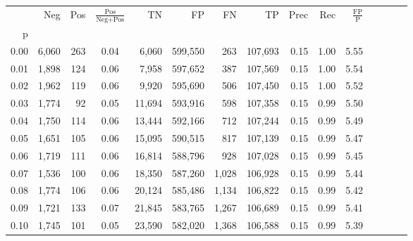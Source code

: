 \begin{tabular}{rrrcrrrrrrrrrrr}
\toprule
{} &     Neg &    Pos & $\frac{\text{Pos}}{\text{Neg}+\text{Pos}}$ &       TN &       FP &       FN &       TP &  Prec &   Rec & $\frac{\text{FP}}{\text{P}}$ \\
p    &         &        &                                            &          &          &          &          &       &       &                              \\
\midrule
0.00 &   6,060 &    263 &                                       0.04 &    6,060 &  599,550 &      263 &  107,693 &  0.15 &  1.00 &                         5.55 \\
0.01 &   1,898 &    124 &                                       0.06 &    7,958 &  597,652 &      387 &  107,569 &  0.15 &  1.00 &                         5.54 \\
0.02 &   1,962 &    119 &                                       0.06 &    9,920 &  595,690 &      506 &  107,450 &  0.15 &  1.00 &                         5.52 \\
0.03 &   1,774 &     92 &                                       0.05 &   11,694 &  593,916 &      598 &  107,358 &  0.15 &  0.99 &                         5.50 \\
0.04 &   1,750 &    114 &                                       0.06 &   13,444 &  592,166 &      712 &  107,244 &  0.15 &  0.99 &                         5.49 \\
0.05 &   1,651 &    105 &                                       0.06 &   15,095 &  590,515 &      817 &  107,139 &  0.15 &  0.99 &                         5.47 \\
0.06 &   1,719 &    111 &                                       0.06 &   16,814 &  588,796 &      928 &  107,028 &  0.15 &  0.99 &                         5.45 \\
0.07 &   1,536 &    100 &                                       0.06 &   18,350 &  587,260 &    1,028 &  106,928 &  0.15 &  0.99 &                         5.44 \\
0.08 &   1,774 &    106 &                                       0.06 &   20,124 &  585,486 &    1,134 &  106,822 &  0.15 &  0.99 &                         5.42 \\
0.09 &   1,721 &    133 &                                       0.07 &   21,845 &  583,765 &    1,267 &  106,689 &  0.15 &  0.99 &                         5.41 \\
0.10 &   1,745 &    101 &                                       0.05 &   23,590 &  582,020 &    1,368 &  106,588 &  0.15 &  0.99 &                         5.39 \\

\end{tabular}
